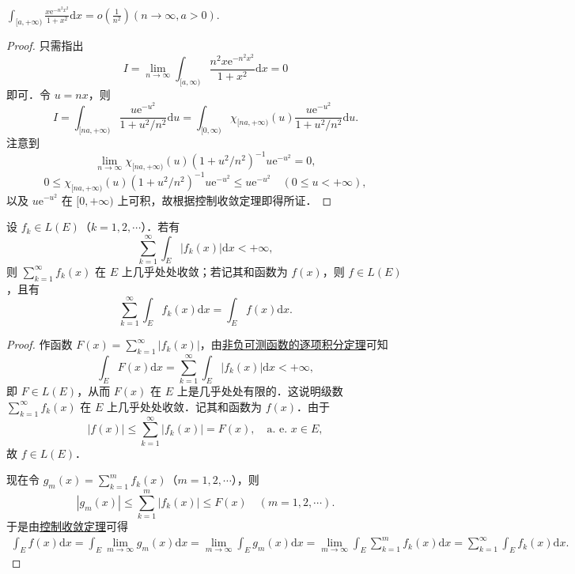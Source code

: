 \documentclass[../../main.tex]{subfiles}
\begin{document}
\begin{example}
$\int_{[a, +\infty)} \frac{x\text{e}^{-n^2 x^2}}{1 + x^2} \mathrm{d}x = o\left( \frac{1}{n^2} \right) (n \to \infty, a > 0).$
\end{example}
\begin{proof}
只需指出
\[
I = \lim_{n \to \infty} \int_{[a, \infty)} \frac{n^2 x\text{e}^{-n^2 x^2}}{1 + x^2} \mathrm{d}x = 0
\]
即可．令 \(u = nx\)，则
\[
I = \int_{[na, +\infty)} \frac{u\text{e}^{-u^2}}{1 + u^2 / n^2} \mathrm{d}u = \int_{[0, \infty)} \chi_{[na, +\infty)}(u) \frac{u\text{e}^{-u^2}}{1 + u^2 / n^2} \mathrm{d}u.
\]
注意到
\[
\lim_{n \to \infty} \chi_{[na, +\infty)}(u) (1 + u^2 / n^2)^{-1} u\text{e}^{-u^2} = 0,
\]
\[
0 \leqslant \chi_{[na, +\infty)}(u) (1 + u^2 / n^2)^{-1} u\text{e}^{-u^2} \leqslant u\text{e}^{-u^2} \quad (0 \leqslant u < +\infty),
\]
以及 \(u\text{e}^{-u^2}\) 在 \([0, +\infty)\) 上可积，故根据控制收敛定理即得所证．

\end{proof}

\begin{corollary}[逐项积分定理]\label{corollary:逐项积分定理}
设 \( f_k \in L(E) \)（\( k = 1,2,\cdots \)）．若有
\[
\sum_{k=1}^{\infty} \int_E |f_k(x)| \mathrm{d}x < +\infty,
\]
则 \( \sum_{k=1}^{\infty} f_k(x) \) 在 \( E \) 上几乎处处收敛；若记其和函数为 \( f(x) \)，则 \( f \in L(E) \)，且有
\[
\sum_{k=1}^{\infty} \int_E f_k(x) \mathrm{d}x = \int_E f(x) \mathrm{d}x. 
\]
\end{corollary}
\begin{proof}
作函数 \( F(x) = \sum_{k=1}^{\infty} |f_k(x)| \)，由\hyperref[theorem:非负可测函数的逐项积分定理]{非负可测函数的逐项积分定理}可知
\[
\int_E F(x) \mathrm{d}x = \sum_{k=1}^{\infty} \int_E |f_k(x)| \mathrm{d}x < +\infty,
\]
即 \( F \in L(E) \)，从而 \( F(x) \) 在 \( E \) 上是几乎处处有限的．这说明级数 \( \sum_{k=1}^{\infty} f_k(x) \) 在 \( E \) 上几乎处处收敛．记其和函数为 \( f(x) \)．由于
\[
|f(x)| \leqslant \sum_{k=1}^{\infty} |f_k(x)| = F(x), \quad \text{a. e. } x \in E,
\]
故 \( f \in L(E) \)．

现在令 \( g_m(x) = \sum_{k=1}^{m} f_k(x) \)（\( m = 1,2,\cdots \)），则
\[
|g_m(x)| \leqslant \sum_{k=1}^{m} |f_k(x)| \leqslant F(x) \quad (m = 1,2,\cdots).
\]
于是由\hyperref[theorem:控制收敛定理]{控制收敛定理}可得
\begin{align*}
\int_E{f(x)\mathrm{d}x}=\int_E{\lim_{m\rightarrow \infty} g_m(x)\mathrm{d}x}=\lim_{m\rightarrow \infty} \int_E{g_m(x)\mathrm{d}x}=\underset{m\rightarrow \infty}{\lim}\int_E{\sum_{k=1}^m{f_k\left( x \right)}\mathrm{d}x}=\sum_{k=1}^{\infty}{\int_E{f_k(x)\mathrm{d}x}}.
\end{align*}

\end{proof}
\end{document}
